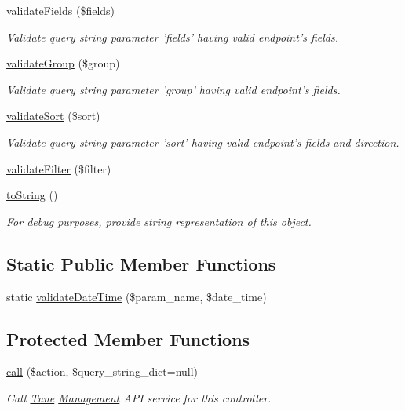 \begin{DoxyCompactItemize}
\hyperlink{classTune_1_1Management_1_1Endpoints_1_1TuneManagementBase_acae456ae93947fb477bea4a847d127a7}{validate\-Fields} (\$fields)
\begin{DoxyCompactList}\small\item\em Validate query string parameter 'fields' having valid endpoint's fields. \end{DoxyCompactList}\item 
\hyperlink{classTune_1_1Management_1_1Endpoints_1_1TuneManagementBase_a54b33f72379846b3c8f8f277bda4bd5f}{validate\-Group} (\$group)
\begin{DoxyCompactList}\small\item\em Validate query string parameter 'group' having valid endpoint's fields. \end{DoxyCompactList}\item 
\hyperlink{classTune_1_1Management_1_1Endpoints_1_1TuneManagementBase_aa81ef05c1abaf189a0fedb49af9df1bd}{validate\-Sort} (\$sort)
\begin{DoxyCompactList}\small\item\em Validate query string parameter 'sort' having valid endpoint's fields and direction. \end{DoxyCompactList}\item 
\hyperlink{classTune_1_1Management_1_1Endpoints_1_1TuneManagementBase_a98d644de253513032083a5504fc2f412}{validate\-Filter} (\$filter)
\item 
\hyperlink{classTune_1_1Management_1_1Endpoints_1_1TuneManagementBase_a856ed22f53fcf641af5468aa0688a343}{to\-String} ()
\begin{DoxyCompactList}\small\item\em For debug purposes, provide string representation of this object. \end{DoxyCompactList}\end{DoxyCompactItemize}
\subsection*{Static Public Member Functions}
\begin{DoxyCompactItemize}
\item 
static \hyperlink{classTune_1_1Management_1_1Endpoints_1_1TuneManagementBase_a6a2939da467d84804f36b2e398516b8d}{validate\-Date\-Time} (\$param\-\_\-name, \$date\-\_\-time)
\end{DoxyCompactItemize}
\subsection*{Protected Member Functions}
\begin{DoxyCompactItemize}
\item 
\hyperlink{classTune_1_1Management_1_1Endpoints_1_1TuneManagementBase_ada037402548c4e93055819e5715937e6}{call} (\$action, \$query\-\_\-string\-\_\-dict=null)
\begin{DoxyCompactList}\small\item\em Call \hyperlink{namespaceTune}{Tune} \hyperlink{namespaceTune_1_1Management}{Management} A\-P\-I service for this controller. \end{DoxyCompactList}\end{DoxyCompactItemize}
